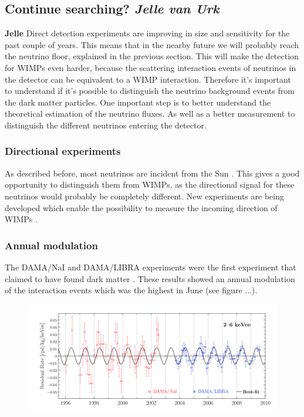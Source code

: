 \documentclass{article}
\begin{document}
\subsection{Continue searching? \small{\textit{Jelle van Urk}}}
\textbf{Jelle}
Direct detection experiments are improving in size and sensitivity for the past couple of years. This means that in the nearby future we will probably reach the neutrino floor, explained in the previous section. This will make the detection for WIMPs even harder, because the scattering interaction events of neutrinos in the detector can be equivalent to a WIMP interaction. Therefore  it's important to understand if it's possible to distinguish the neutrino background events from the dark matter particles. One important step is to better understand the theoretical estimation of the neutrino fluxes. As well as a better measurement to distinguish the different neutrinos entering the detector. 

\subsubsection{Directional experiments}
As described before, most neutrinos are incident from the Sun \cite{Billard:2013qya}. This gives a good opportunity to distinguish them from WIMPs, as the directional signal for these neutrinos would probably be completely different. New experiments are being developed which enable the possibility to measure the incoming direction of WIMPs \cite{Ahlen:2009ev}. 

\subsubsection{Annual modulation}
The DAMA/NaI and DAMA/LIBRA experiments were the first experiment that claimed to have found dark matter \cite{Freese:2012xd}. These results showed an annual modulation of the interaction events which was the highest in June (see figure ...).
\begin{figure}[h]
    \centering
    \includegraphics[width=\textwidth]{Annualmodulation.png}
    \caption{}
\end{figure}
\end{document}
